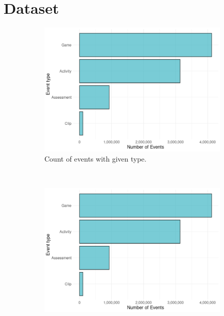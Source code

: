 \documentclass[fleqn,10pt]{SelfArx} %
\begin{document}

\section{Dataset}

\begin{figure} %
    \centering
    \begin{subfigure}[t]{0.31\textwidth}
        \centering
        \includegraphics[width=\linewidth]{images/event-type-count.png}
        \caption{Count of events with given type.}
    \end{subfigure}
    ~
    \begin{subfigure}[t]{0.31\textwidth}
        \centering
        \includegraphics[width=\linewidth]{images/event-type-count.png}

\end{subfigure}
\end{figure}
\end{document}
